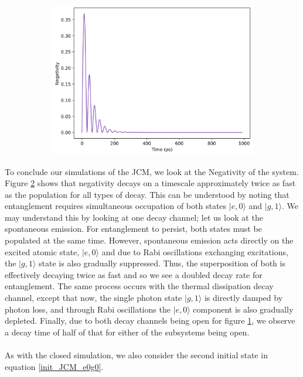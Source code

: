 \documentclass[12pt]{article}
\begin{document}
\begin{figure}[H]
    \vspace{0.5cm}
    
    \begin{subfigure}{0.45\textwidth}
        \centering
        \includegraphics[width=\linewidth]{Research Project/Code/results/JCM/OQS_Neg_Both.png}
        \caption{}
        \label{fig:JCM_OQS_Neg_Both}
    \end{subfigure}
    \hfill
    \caption{}
    \label{fig:JCM_OQS_Neg}
\end{figure}

To conclude our simulations of the JCM, we look at the Negativity of the system. Figure \ref{fig:JCM_OQS_Neg} shows that negativity decays on a timescale approximately twice as fast as the population for all types of decay. This can be understood by noting that entanglement requires simultaneous occupation of both states $|e,0\rangle$ and $|g,1\rangle$. We may understand this by looking at one decay channel; let us look at the spontaneous emission. For entanglement to persist, both states must be populated at the same time. However, spontaneous emission acts directly on the excited atomic state, $|e,0\rangle$  and due to Rabi oscillations exchanging excitations, the $|g,1\rangle$ state is also gradually suppressed. Thus, the superposition of both is effectively decaying twice as fast and so we see a doubled decay rate for entanglement. The same process occurs with the thermal dissipation decay channel, except that now, the single photon state $|g,1\rangle$ is directly damped by photon loss, and through Rabi oscillations the $|e,0\rangle$ component is also gradually depleted. Finally, due to both decay channels being open for figure \ref{fig:JCM_OQS_Neg_Both}, we observe a decay time of half of that for either of the subsystems being open. \\
\\
As with the closed simulation, we also consider the second initial state in equation \eqref{init_JCM_e0g0}.
\end{document}
